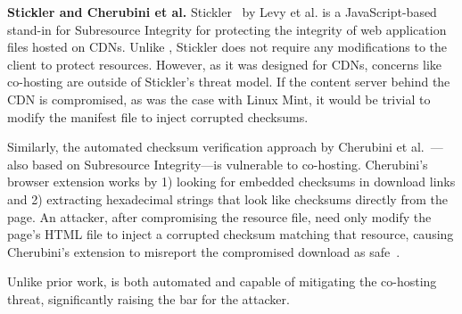 \noindent\textbf{Stickler and Cherubini et al.} Stickler~\cite{Stickler} by Levy
et al. is a JavaScript-based stand-in for Subresource Integrity for protecting
the integrity of web application files hosted on CDNs. Unlike \SYSTEM{},
Stickler does not require any modifications to the client to protect resources.
However, as it was designed for CDNs, concerns like co-hosting are outside of
Stickler's threat model. If the content server behind the CDN is compromised, as
was the case with Linux Mint, it would be trivial to modify the manifest file to
inject corrupted checksums.

Similarly, the automated checksum verification approach by Cherubini et
al.~\cite{Cherubini}---also based on Subresource Integrity---is vulnerable to
co-hosting. Cherubini's browser extension works by 1) looking for embedded
checksums in download links and 2) extracting hexadecimal strings that look like
checksums directly from the page. An attacker, after compromising the resource
file, need only modify the page's HTML file to inject a corrupted checksum
matching that resource, causing Cherubini's extension to misreport the
compromised download as safe~\cite{Cherubini}.

Unlike prior work, \SYSTEM{} is both automated and capable of mitigating the
co-hosting threat, significantly raising the bar for the attacker.
